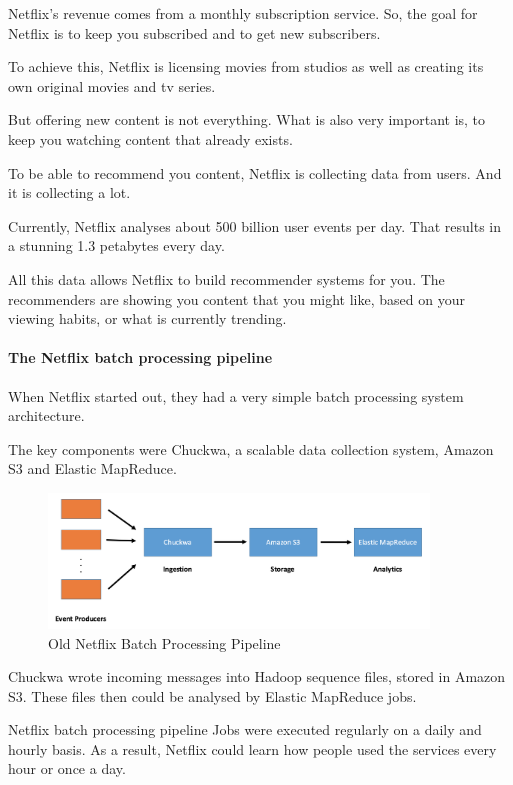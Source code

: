 \documentclass[12pt]{scrartcl} %
\begin{document}
Netflix’s revenue comes from a monthly subscription service. So, the goal for Netflix is to keep you subscribed and to get new subscribers.

To achieve this, Netflix is licensing movies from studios as well as creating its own original movies and tv series.

But offering new content is not everything. What is also very important is, to keep you watching content that already exists.

To be able to recommend you content, Netflix is collecting data from users. And it is collecting a lot.

Currently, Netflix analyses about 500 billion user events per day. That results in a stunning 1.3 petabytes every day.

All this data allows Netflix to build recommender systems for you. The recommenders are showing you content that you might like, based on your viewing habits, or what is currently trending.

\paragraph{The Netflix batch processing pipeline}
When Netflix started out, they had a very simple batch processing system architecture.

The key components were Chuckwa, a scalable data collection system, Amazon S3 and Elastic MapReduce.

\begin{figure}[htbp]
  \centering
     \includegraphics[width=0.9\textwidth]{images/Netflix-Chuckwa-Pipeline}
  \caption{Old Netflix Batch Processing Pipeline}
  \label{fig:Bild1}
\end{figure}

Chuckwa wrote incoming messages into Hadoop sequence files, stored in Amazon S3. These files then could be analysed by Elastic MapReduce jobs.

Netflix batch processing pipeline
Jobs were executed regularly on a daily and hourly basis. As a result, Netflix could learn how people used the services every hour or once a day.
\end{document}
